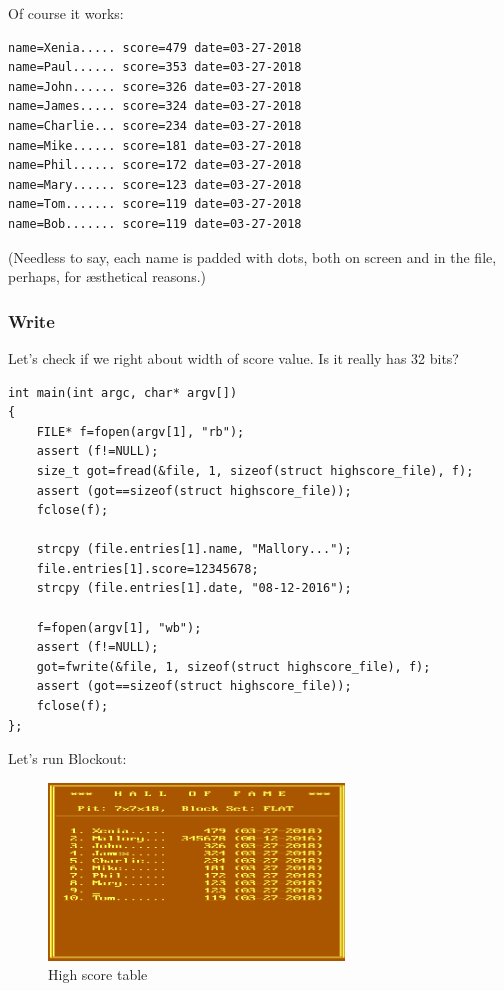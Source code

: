 Of course it works:

\begin{lstlisting}
name=Xenia..... score=479 date=03-27-2018
name=Paul...... score=353 date=03-27-2018
name=John...... score=326 date=03-27-2018
name=James..... score=324 date=03-27-2018
name=Charlie... score=234 date=03-27-2018
name=Mike...... score=181 date=03-27-2018
name=Phil...... score=172 date=03-27-2018
name=Mary...... score=123 date=03-27-2018
name=Tom....... score=119 date=03-27-2018
name=Bob....... score=119 date=03-27-2018
\end{lstlisting}

(Needless to say, each name is padded with dots, both on screen and in the file, perhaps, for \ae{}sthetical reasons.)

\subsubsection{Write}

Let's check if we right about width of score value. Is it really has 32 bits?

\begin{lstlisting}[style=customc]
int main(int argc, char* argv[])
{
	FILE* f=fopen(argv[1], "rb");
	assert (f!=NULL);
	size_t got=fread(&file, 1, sizeof(struct highscore_file), f);
	assert (got==sizeof(struct highscore_file));
	fclose(f);

	strcpy (file.entries[1].name, "Mallory...");
	file.entries[1].score=12345678;
	strcpy (file.entries[1].date, "08-12-2016");

	f=fopen(argv[1], "wb");
	assert (f!=NULL);
	got=fwrite(&file, 1, sizeof(struct highscore_file), f);
	assert (got==sizeof(struct highscore_file));
	fclose(f);
};
\end{lstlisting}

Let's run Blockout:

\begin{figure}[H]
\centering
\includegraphics[width=0.7\textwidth]{advanced/550_more_structs/blockout/hs345678.png}
\caption{High score table}
\end{figure}

